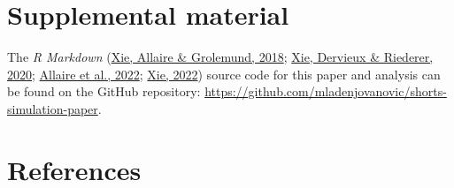 \documentclass[fleqn,10pt]{wlpeerj} %
\begin{document}
\FloatBarrier

\hypertarget{supplemental-material}{%
\section{Supplemental material}\label{supplemental-material}}

The \emph{R Markdown} (\protect\hyperlink{ref-rmarkdown2018}{Xie, Allaire \& Grolemund, 2018}; \protect\hyperlink{ref-rmarkdown2020}{Xie, Dervieux \& Riederer, 2020}; \protect\hyperlink{ref-R-rmarkdown}{Allaire et al., 2022}; \protect\hyperlink{ref-R-bookdown}{Xie, 2022}) source code for this paper and analysis can be found on the GitHub repository: \url{https://github.com/mladenjovanovic/shorts-simulation-paper}.

\hypertarget{references}{%
\section*{References}\label{references}}
\end{document}
